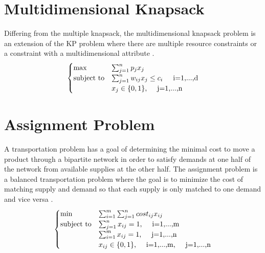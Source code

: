 \section{Multidimensional Knapsack}
Differing from the multiple knapsack, the multidimensional knapsack problem is an extension of the KP problem where there are multiple resource constraints or a constraint with a multidimensional attribute \cite{knapsackProblems}. 
\begin{align}
\begin{cases}
\max &\sum_{j=1}^n p_jx_j\\
\text{subject to} &\sum_{j=1}^n w_{ij}x_j\leq c_i \hspace{5mm}\text{i=1,...,d}\\
&x_j \in \{0,1\} \text{,}	\hspace{5mm}\text{j=1,...,n}
\end{cases}
\end{align}
\cite{Shih1979AProblem}

\section{Assignment Problem} A transportation problem has a goal of determining the minimal cost to move a product through a bipartite network in order to satisfy demands at one half of the network from available supplies at the other half. \cite{ahuja} The assignment problem is a balanced transportation problem where the goal is to minimize the cost of matching supply and demand so that each supply is only matched to one demand and vice versa \cite{Winston2004OperationsAlgorithms}. 
%
\begin{align}
\begin{cases}
\min 				&\sum_{i=1}^m\sum_{j=1}^n cost_{ij}x_{ij} \\
\text{subject to}   &\sum_{j=1}^n x_{ij}= 1 \text{,}	 \hspace{5mm}\text{i=1,...,m}\\
					&\sum_{i=1}^m x_{ij}= 1 		\text{,} 	 \hspace{5mm}\text{j=1,...,n}\\
					&x_{ij} \in \{0,1\} 				\text{,}	 \hspace{5mm}\text{i=1,...,m}\text{,}	 \hspace{5mm}\text{j=1,...,n}
\end{cases}
\end{align}

